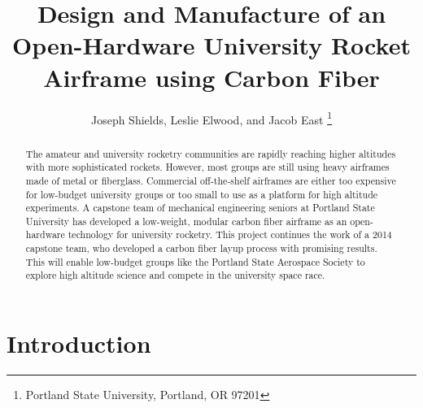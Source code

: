 \documentclass{aiaa-tc}%
\title{Design and Manufacture of an Open-Hardware 
 	University Rocket Airframe using Carbon Fiber}
\author{
Joseph Shields, Leslie Elwood, and Jacob East%
	\thanks{Portland State University, Portland, OR 97201}
 }
\begin{document}
\maketitle

\begin{abstract}
The amateur and university rocketry communities are rapidly reaching higher altitudes with more sophisticated rockets. However, most groups are still using heavy airframes made of metal or fiberglass. Commercial off-the-shelf airframes are either too expensive for low-budget university groups or too small to use as a platform for high altitude experiments. 
A capstone team of mechanical engineering seniors at Portland State University has developed a low-weight, modular carbon fiber airframe as an open-hardware technology for university rocketry. 
This project continues the work of a 2014 capstone team, who developed a carbon fiber layup process with promising results. 
This will enable low-budget groups like the Portland State Aerospace Society to explore high altitude science and compete in the university space race.  \end{abstract}

\printnomenclature


\section{Introduction}
\end{document}

